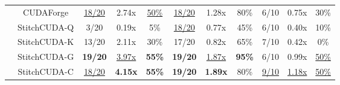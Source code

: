 \begin{table}[h]
{\begin{tabular}{c|c|ccc|ccc|ccc}
                                                                                 & CUDAForge                          & {\underline{18/20}}    & 2.74x          & {\underline {50\%}}       & \underline{18/20}          & 1.28x          & 80\%             & 6/10                        & 0.75x                        & 30\%                     \\
                                                                                 & StitchCUDA-Q  
                                                                                 & 3/20 & 0.19x & 5\% & \underline{18/20}              & 0.77x              & 45\%                & 6/10	&0.40x	& 10\%                               \\
                                                                                 & \multicolumn{1}{l|}{StitchCUDA-K} & 13/20          & 2.11x          & 30\%          & 17/20          & 0.82x          & 65\%          & 7/10 & { 0.42x} & { 0\%} \\
                                                                                 & \multicolumn{1}{l|}{StitchCUDA-G} & \textbf{19/20} & \underline{3.97x} & \textbf{55\%} & \textbf{19/20} & \underline{1.87x} & \textbf{95\%} & 6/10                  & { 0.99x}                  & {\underline{ 50\%}}            \\
                                                                                 & StitchCUDA-C                            & \underline{18/20}          & \textbf{4.15x}          & \textbf{55\% }         & \textbf{19/20}           & \textbf{1.89x}          & 80\%             & \underline{9/10}                        & \underline{1.18x}                        & \underline{50\%}                     \\
                                                                                 

\end{tabular}}
\end{table}
